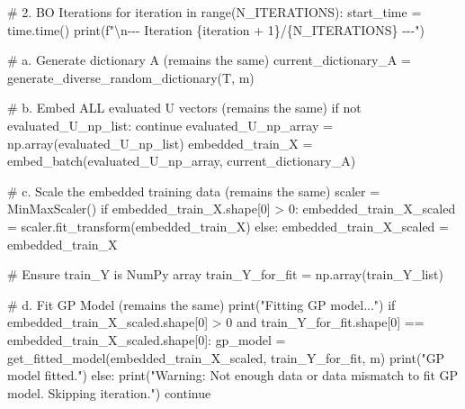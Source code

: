 \documentclass[
  letterpaper,
  DIV=11,
  numbers=noendperiod]{scrartcl}
\newenvironment{Shaded}{\begin{snugshade}}{\end{snugshade}}
\newcommand{\BuiltInTok}[1]{\textcolor[rgb]{0.00,0.23,0.31}{#1}}
\newcommand{\CharTok}[1]{\textcolor[rgb]{0.13,0.47,0.30}{#1}}
\newcommand{\CommentTok}[1]{\textcolor[rgb]{0.37,0.37,0.37}{#1}}
\newcommand{\ControlFlowTok}[1]{\textcolor[rgb]{0.00,0.23,0.31}{#1}}
\newcommand{\DecValTok}[1]{\textcolor[rgb]{0.68,0.00,0.00}{#1}}
\newcommand{\KeywordTok}[1]{\textcolor[rgb]{0.00,0.23,0.31}{#1}}
\newcommand{\NormalTok}[1]{\textcolor[rgb]{0.00,0.23,0.31}{#1}}
\newcommand{\OperatorTok}[1]{\textcolor[rgb]{0.37,0.37,0.37}{#1}}
\newcommand{\SpecialCharTok}[1]{\textcolor[rgb]{0.37,0.37,0.37}{#1}}
\newcommand{\SpecialStringTok}[1]{\textcolor[rgb]{0.13,0.47,0.30}{#1}}
\newcommand{\StringTok}[1]{\textcolor[rgb]{0.13,0.47,0.30}{#1}}
\begin{document}
\begin{Shaded}
\begin{Highlighting}[]
\CommentTok{\# 2. BO Iterations}
\ControlFlowTok{for}\NormalTok{ iteration }\KeywordTok{in} \BuiltInTok{range}\NormalTok{(N\_ITERATIONS):}
\NormalTok{    start\_time }\OperatorTok{=}\NormalTok{ time.time()}
    \BuiltInTok{print}\NormalTok{(}\SpecialStringTok{f"}\CharTok{\textbackslash{}n}\SpecialStringTok{{-}{-}{-} Iteration }\SpecialCharTok{\{}\NormalTok{iteration }\OperatorTok{+} \DecValTok{1}\SpecialCharTok{\}}\SpecialStringTok{/}\SpecialCharTok{\{}\NormalTok{N\_ITERATIONS}\SpecialCharTok{\}}\SpecialStringTok{ {-}{-}{-}"}\NormalTok{)}

    \CommentTok{\# a. Generate dictionary A (remains the same)}
\NormalTok{    current\_dictionary\_A }\OperatorTok{=}\NormalTok{ generate\_diverse\_random\_dictionary(T, m)}

    \CommentTok{\# b. Embed ALL evaluated U vectors (remains the same)}
    \ControlFlowTok{if} \KeywordTok{not}\NormalTok{ evaluated\_U\_np\_list: }\ControlFlowTok{continue}
\NormalTok{    evaluated\_U\_np\_array }\OperatorTok{=}\NormalTok{ np.array(evaluated\_U\_np\_list)}
\NormalTok{    embedded\_train\_X }\OperatorTok{=}\NormalTok{ embed\_batch(evaluated\_U\_np\_array, current\_dictionary\_A)}

    \CommentTok{\# c. Scale the embedded training data (remains the same)}
\NormalTok{    scaler }\OperatorTok{=}\NormalTok{ MinMaxScaler()}
    \ControlFlowTok{if}\NormalTok{ embedded\_train\_X.shape[}\DecValTok{0}\NormalTok{] }\OperatorTok{\textgreater{}} \DecValTok{0}\NormalTok{: embedded\_train\_X\_scaled }\OperatorTok{=}\NormalTok{ scaler.fit\_transform(embedded\_train\_X)}
    \ControlFlowTok{else}\NormalTok{: embedded\_train\_X\_scaled }\OperatorTok{=}\NormalTok{ embedded\_train\_X}

    \CommentTok{\# Ensure train\_Y is NumPy array}
\NormalTok{    train\_Y\_for\_fit }\OperatorTok{=}\NormalTok{ np.array(train\_Y\_list)}

    \CommentTok{\# d. Fit GP Model (remains the same)}
    \BuiltInTok{print}\NormalTok{(}\StringTok{"Fitting GP model..."}\NormalTok{)}
    \ControlFlowTok{if}\NormalTok{ embedded\_train\_X\_scaled.shape[}\DecValTok{0}\NormalTok{] }\OperatorTok{\textgreater{}} \DecValTok{0} \KeywordTok{and}\NormalTok{ train\_Y\_for\_fit.shape[}\DecValTok{0}\NormalTok{] }\OperatorTok{==}\NormalTok{ embedded\_train\_X\_scaled.shape[}\DecValTok{0}\NormalTok{]:}
\NormalTok{        gp\_model }\OperatorTok{=}\NormalTok{ get\_fitted\_model(embedded\_train\_X\_scaled, train\_Y\_for\_fit, m)}
        \BuiltInTok{print}\NormalTok{(}\StringTok{"GP model fitted."}\NormalTok{)}
    \ControlFlowTok{else}\NormalTok{:}
        \BuiltInTok{print}\NormalTok{(}\StringTok{"Warning: Not enough data or data mismatch to fit GP model. Skipping iteration."}\NormalTok{)}
        \ControlFlowTok{continue}


\end{Highlighting}
\end{Shaded}
\end{document}
